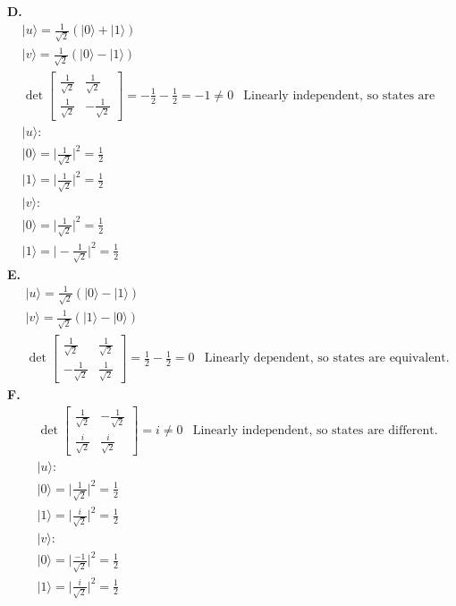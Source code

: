 \documentclass{article}
\def\ket#1{|#1\rangle}
\begin{document}
\textbf{D. }
\begin{align*}
    &\ket{u} = \frac{1}{\sqrt{2}}(\ket{0} + \ket{1}) \\ 
    & \ket{v} = \frac{1}{\sqrt{2}}(\ket{0} - \ket{1}) \\ 
    &\det{\begin{bmatrix}
    \frac{1}{\sqrt{2}} & \frac{1}{\sqrt{2}} \\ \frac{1}{\sqrt{2}} & -\frac{1}{\sqrt{2}}
    \end{bmatrix}} = -\frac{1}{2} - \frac{1}{2} = -1 \neq{0} 
    &\text{Linearly independent, so states are different.} 
    \\ 
    &\ket{u}: \\
    &\ket{0} = |\frac{1}{\sqrt{2}}|^2 = \frac{1}{2} \\ 
    &\ket{1} = |\frac{1}{\sqrt{2}}|^2 = \frac{1}{2} \\
    &\ket{v}: \\
    &\ket{0} = |\frac{1}{\sqrt{2}}|^2 = \frac{1}{2} \\ 
    &\ket{1} = |-\frac{1}{\sqrt{2}}|^2 = \frac{1}{2} 
\end{align*}
\textbf{E. }
\begin{align*}
    &\ket{u} = \frac{1}{\sqrt{2}}(\ket{0} - \ket{1}) \\ 
    & \ket{v} = \frac{1}{\sqrt{2}}(\ket{1} - \ket{0}) \\ 
    &\det{\begin{bmatrix}
    \frac{1}{\sqrt{2}} & \frac{1}{\sqrt{2}} \\ -\frac{1}{\sqrt{2}} & \frac{1}{\sqrt{2}}
    \end{bmatrix}} = \frac{1}{2} - \frac{1}{2} = 0  
    &\text{Linearly dependent, so states are equivalent.} 
\end{align*}
\textbf{F. }
\begin{align*}
    &\det{\begin{bmatrix}
    \frac{1}{\sqrt{2}} & -\frac{1}{\sqrt{2}} \\ \frac{i}{\sqrt{2}} & \frac{i}{\sqrt{2}}
    \end{bmatrix}} = i \neq{0}  
    &\text{Linearly independent, so states are different.} 
    \\ 
    &\ket{u}: \\
    &\ket{0} = |\frac{1}{\sqrt{2}}|^2 = \frac{1}{2} \\ 
    &\ket{1} = |\frac{i}{\sqrt{2}}|^2 = \frac{1}{2} \\
    &\ket{v}: \\
    &\ket{0} = |\frac{-1}{\sqrt{2}}|^2 = \frac{1}{2} \\ 
    &\ket{1} = |\frac{i}{\sqrt{2}}|^2 = \frac{1}{2} 
\end{align*}
\end{document}
